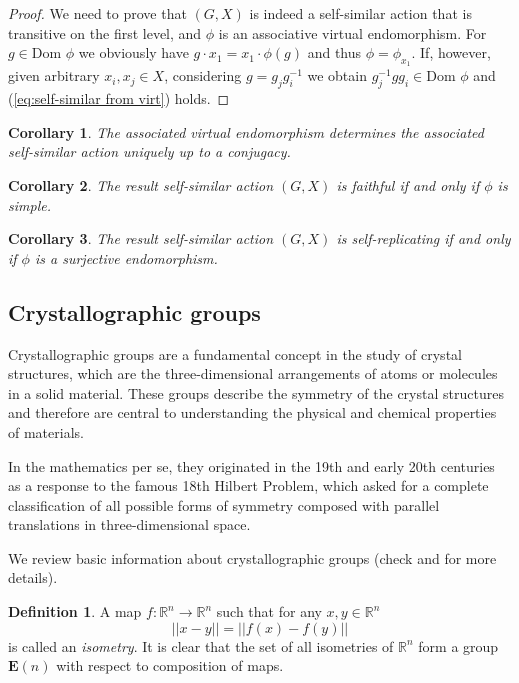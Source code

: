 \documentclass[a4paper,12pt]{amsart}
\newtheorem{corollary}{Corollary}[theorem]
\theoremstyle{definition}
\newtheorem{definition}{Definition}
\newcommand{\Dom}{\text{Dom }}
\begin{document}
	\begin{proof}
		We need to prove that $(G, X)$ is indeed a self-similar action that is transitive on the first level, and $\phi$ is an associative virtual endomorphism. For $g \in \Dom \phi$ we obviously have $g \cdot x_1 = x_1 \cdot \phi(g)$ and thus $\phi = \phi_{x_1}$. If, however, given arbitrary $x_i, x_j \in X$, considering $g = g_j g_i^{-1}$ we obtain $g^{-1}_j g g_i \in \Dom \phi$ and (\ref{eq:self-similar from virt}) holds. 
		
	\end{proof}
	
	\begin{corollary}
		The associated virtual endomorphism determines the associated self-similar action uniquely up to a conjugacy.
	\end{corollary}

	\begin{corollary}
		The result self-similar action $(G, X)$ is faithful if and only if $\phi$ is simple. 
	\end{corollary}
	
	\begin{corollary}
		The result self-similar action $(G, X)$ is self-replicating if and only if $\phi$ is a surjective endomorphism.
	\end{corollary}
	
	
	\subsection{Crystallographic groups} Crystallographic groups are a fundamental concept in the study of crystal structures, which are the three-dimensional arrangements of atoms or molecules in a solid material. These groups describe the symmetry of the crystal structures and therefore are central to understanding the physical and chemical properties of materials. 
	
	In the mathematics per se, they originated in the 19th and early 20th centuries as a response to the famous 18th Hilbert Problem, which asked for a complete classification of all possible forms of symmetry composed with parallel translations in three-dimensional space. 	
	
	We review basic information about crystallographic groups (check \cite{cryst:group_theory} and \cite{cryst:geometry_of_cryst} for more details).
	
	
	\begin{definition}
		A map $f: \mathbb{R}^n \rightarrow \mathbb{R}^n$ such that for any $x, y \in \mathbb{R}^n$
		$$
		||x - y|| = ||f(x) - f(y)||
		$$
		is called an \textit{isometry}.  
		It is clear that the set of all isometries of $\mathbb{R}^n$ form a group $\mathbf{E}(n)$ with respect to composition of maps.
	\end{definition}
	
\end{document}
